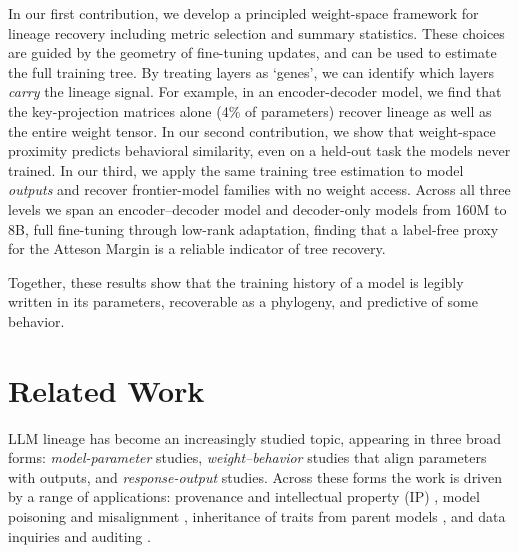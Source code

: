 \documentclass{article}
\theoremstyle{definition}
\theoremstyle{plain}
\begin{document}
In our first contribution, we develop a principled weight-space framework
for lineage recovery including metric selection and summary statistics.  These choices are guided by the geometry of fine-tuning updates, and can be used to estimate the full training tree. By treating layers as `genes', we can identify which layers \emph{carry} the lineage signal.  For example, in an encoder-decoder model, we find that the key-projection matrices alone (4\% of parameters) recover lineage as well as
the entire weight tensor. In our second contribution, we show that weight-space proximity predicts
behavioral similarity, even on a held-out task the models never trained. In our third, we apply the same
training tree estimation to model \emph{outputs} and recover frontier-model
families with no weight access. Across all three levels we span an
encoder--decoder model and decoder-only models from 160M to 8B, full
fine-tuning through low-rank adaptation, finding that a label-free proxy for the Atteson Margin is a reliable indicator of tree recovery.

Together, these results show that the training history of a model is legibly
written in its parameters, recoverable as a phylogeny, and predictive of some
behavior.







\section{Related Work}
\label{sec:related}

LLM lineage has become an increasingly studied topic, appearing in three broad forms:
\emph{model-parameter} studies, \emph{weight--behavior} studies that align parameters with
outputs, and \emph{response-output} studies. Across these forms the work is driven by a range of
applications: provenance and intellectual property (IP)
\citep{horwitz2024mother, zeng2024huref, nikolic2026model}, model poisoning and misalignment
\citep{cloud2025subliminal}, inheritance of traits from parent models
\citep{cloud2025subliminal, agents2026same}, and data inquiries and auditing
\citep{zhu2025independence}.
\end{document}

